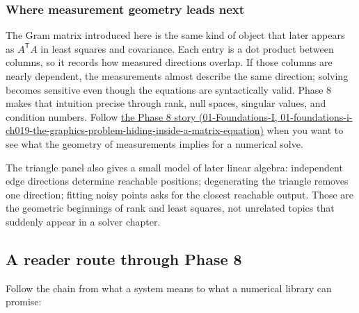 \subsubsection{Where measurement geometry leads next}\label{02-foundations-ii-ch039-where-measurement-geometry-leads-next}

The Gram matrix introduced here is the same kind of object that later appears as \(A^\mathsf T A\) in least squares and covariance. Each entry is a dot product between columns, so it records how measured directions overlap. If those columns are nearly dependent, the measurements almost describe the same direction; solving becomes sensitive even though the equations are syntactically valid. Phase 8 makes that intuition precise through rank, null spaces, singular values, and condition numbers. Follow \href{../01-Foundations-I/main.pdf\#nameddest=01-foundations-i-ch019-the-graphics-problem-hiding-inside-a-matrix-equation}{the Phase 8 story (01-Foundations-I, 01-foundations-i-ch019-the-graphics-problem-hiding-inside-a-matrix-equation)} when you want to see what the geometry of measurements implies for a numerical solve.

The triangle panel also gives a small model of later linear algebra: independent edge directions determine reachable positions; degenerating the triangle removes one direction; fitting noisy points asks for the closest reachable output. Those are the geometric beginnings of rank and least squares, not unrelated topics that suddenly appear in a solver chapter.

\subsection{A reader route through Phase 8}\label{02-foundations-ii-ch039-a-reader-route-through-phase-8}

Follow the chain from what a system means to what a numerical library can promise:

